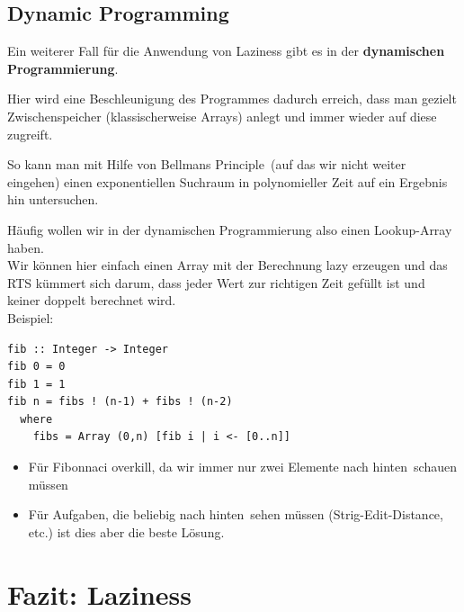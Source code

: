 \documentclass{beamer}
\begin{document}
\subsection{Dynamic Programming}

\begin{frame}[fragile]
Ein weiterer Fall für die Anwendung von Laziness gibt es in der \textbf{dynamischen Programmierung}.\\\par\pause
Hier wird eine Beschleunigung des Programmes dadurch erreich, dass man gezielt Zwischenspeicher (klassischerweise Arrays) anlegt und immer wieder auf diese zugreift.\\\par\pause
So kann man mit Hilfe von \glqq Bellmans Principle\grqq \ (auf das wir nicht weiter eingehen) einen exponentiellen Suchraum in polynomieller Zeit auf ein Ergebnis hin untersuchen.
\end{frame}

\begin{frame}[fragile]
Häufig wollen wir in der dynamischen Programmierung also einen Lookup-Array haben.\\\pause
Wir können hier einfach einen Array mit der Berechnung lazy erzeugen und das RTS kümmert sich darum, dass jeder Wert zur richtigen Zeit gefüllt ist und keiner doppelt berechnet wird.\\\pause
Beispiel:
\begin{verbatim}
fib :: Integer -> Integer
fib 0 = 0
fib 1 = 1
fib n = fibs ! (n-1) + fibs ! (n-2)
  where
    fibs = Array (0,n) [fib i | i <- [0..n]]
\end{verbatim}
\pause
\begin{itemize}
 \item Für Fibonnaci overkill, da wir immer nur zwei Elemente \glqq nach hinten\grqq\ schauen müssen
 \pause
 \item Für Aufgaben, die beliebig \glqq nach hinten\grqq\ sehen müssen (Strig-Edit-Distance, etc.) ist dies aber die beste Lösung.
\end{itemize}

\end{frame}

\section{Fazit: Laziness}
\end{document}
